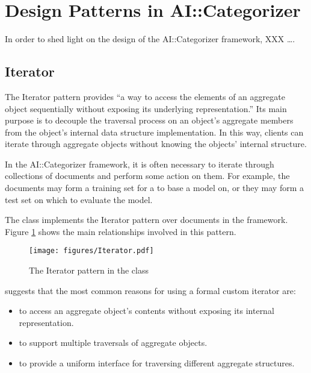 \documentclass[a4paper]{report}
\begin{document}
\section{Design Patterns in AI::Categorizer}

In order to shed light on the design of the AI::Categorizer framework,
XXX \ldots.


\subsection{Iterator}

The Iterator pattern provides ``a way to access the elements of an
aggregate object sequentially without exposing its underlying
representation.'' \cite[p. 257]{gamma:95} Its main purpose is to
decouple the traversal process on an object's aggregate members from
the object's internal data structure implementation.  In this way,
clients can iterate through aggregate objects without knowing the
objects' internal structure.

In the AI::Categorizer framework, it is often necessary to iterate
through collections of documents and perform some action on them.  For
example, the documents may form a training set for a  to base a
model on, or they may form a test set on which to evaluate the model.

The  class implements the Iterator pattern
\cite[p. 257]{gamma:95} over documents in the framework.  Figure
\ref{Iterator-collection} shows the main relationships involved in
this pattern.

\begin{figure}
\texttt{[image: figures/Iterator.pdf]}
\caption{The Iterator pattern in the  class}
\label{Iterator-collection}
\end{figure}


\cite[p. 259]{gamma:95} suggests that the most common reasons for
using a formal custom iterator are:

\begin{itemize}

\item to access an aggregate object's contents without exposing its
internal representation.

\item to support multiple traversals of aggregate objects.

\item to provide a uniform interface for traversing different
aggregate structures.

\end{itemize}
\end{document}
